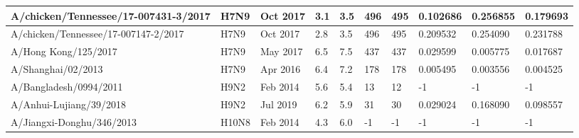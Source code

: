\begin{tabular}{L{1.9in}|L{.35in}|L{.35in}|L{.35in}|L{.35in}|L{.35in}|L{.35in}|L{.42in}|L{.42in}|L{.42in}}
A/chicken/Tennessee/17-007431-3/2017 & H7N9 & Oct 2017 & 3.1 &3.5 &496 & 495 &0.102686 &0.256855 &0.179693 \\\hline
A/chicken/Tennessee/17-007147-2/2017 & H7N9 & Oct 2017 & 2.8 &3.5 & 496 & 495 &0.209532 &0.254090 &0.231788 \\\hline
A/Hong Kong/125/2017 & H7N9 & May 2017 & 6.5 &7.5 &437 & 437 &0.029599 &0.005775 &0.017687 \\\hline
A/Shanghai/02/2013 & H7N9 & Apr 2016 & 6.4 &7.2 & 178 & 178 &0.005495 &0.003556 &0.004525 \\\hline
A/Bangladesh/0994/2011 & H9N2 & Feb 2014 & 5.6 &5.4 &13 &12 & -1 & -1 & -1 \\\hline
A/Anhui-Lujiang/39/2018 & H9N2 & Jul 2019 & 6.2 &5.9 &31 &30 &0.029024 &0.168090 &0.098557 \\\hline
A/Jiangxi-Donghu/346/2013 &H10N8 & Feb 2014 & 4.3 &6.0 & -1 &-1 & -1 & -1 & -1 \\\hline
\end{tabular}
